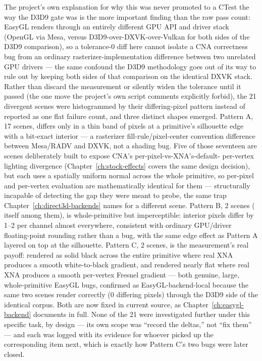 The project's own explanation for why this was never promoted to a CTest the way the D3D9 gate
was is the more important finding than the raw pass count: EasyGL renders through an entirely
different GPU API and driver stack (OpenGL via Mesa, versus D3D9-over-DXVK-over-Vulkan for both
sides of the D3D9 comparison), so a tolerance-0 diff here cannot isolate a CNA correctness bug
from an ordinary rasterizer-implementation difference between two unrelated GPU drivers --- the
same confound the D3D9 methodology goes out of its way to rule out by keeping both sides of that
comparison on the identical DXVK stack. Rather than discard the measurement or silently widen the
tolerance until it passed (the one move the project's own script comments explicitly forbid), the
21 divergent scenes were histogrammed by their differing-pixel pattern instead of reported as one
flat failure count, and three distinct shapes emerged. Pattern A, 17 scenes, differs only in a
thin band of pixels at a primitive's silhouette edge with a bit-exact interior --- a rasterizer
fill-rule/pixel-center convention difference between Mesa/RADV and DXVK, not a shading bug. Five
of those seventeen are scenes deliberately built to expose CNA's per-pixel-vs-XNA's-default-
per-vertex lighting divergence (Chapter~\ref{ch:stock-effects} covers the same design decision),
but each uses a spatially uniform normal across the whole primitive, so per-pixel and per-vertex
evaluation are mathematically identical for them --- structurally incapable of detecting the gap
they were meant to probe, the same trap Chapter~\ref{ch:direct3d-backends} names for a different
scene. Pattern B, 2 scenes ( itself among them), is whole-primitive but
imperceptible: interior pixels differ by 1--2 per channel almost everywhere, consistent with
ordinary GPU/driver floating-point rounding rather than a bug, with the same edge effect as
Pattern A layered on top at the silhouette. Pattern C, 2 scenes, is the measurement's real payoff:
 rendered as solid black across the entire primitive where real XNA
produces a smooth white-to-black gradient, and  rendered nearly
flat where real XNA produces a smooth per-vertex Fresnel gradient --- both genuine, large,
whole-primitive EasyGL bugs, confirmed as EasyGL-backend-local because the same two scenes render
correctly (0 differing pixels) through the D3D9 side of the identical corpus. Both are now fixed
in current source, as Chapter~\ref{ch:easygl-backend} documents in full. None of the 21 were
investigated further under this specific task, by design --- its own scope was ``record the
deltas,'' not ``fix them'' --- and each was logged with its evidence for whoever picked up the
corresponding  item next, which is exactly how Pattern C's two bugs
were later closed.

